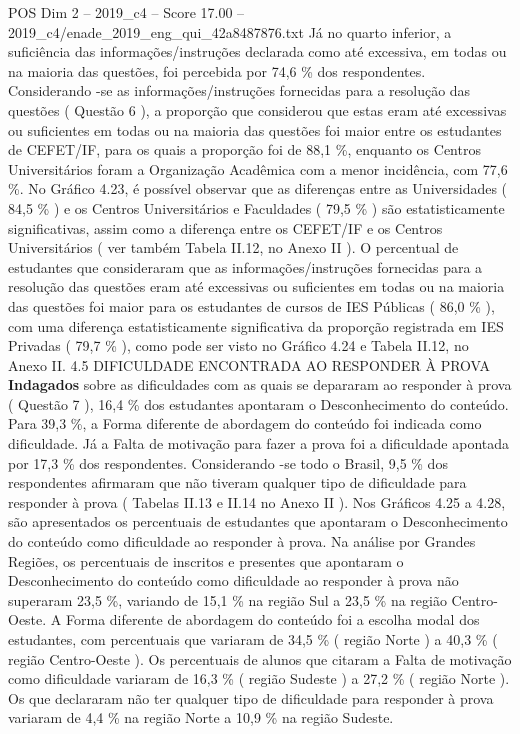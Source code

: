 \begin{textsample}{POS Dim 2 – 2019\_c4 – Score 17.00 – 2019\_c4/enade\_2019\_eng\_qui\_42a8487876.txt}
Já no quarto inferior, a suficiência das informações/instruções declarada como até excessiva, em todas ou na maioria das questões, foi percebida por 74,6 \% dos respondentes.
Considerando -se as informações/instruções fornecidas para a resolução das questões ( Questão 6 ), a proporção que considerou que estas eram até excessivas ou suficientes em todas ou na maioria das questões foi maior entre os estudantes de CEFET/IF, para os quais a proporção foi de 88,1 \%, enquanto os Centros Universitários foram a Organização Acadêmica com a menor incidência, com 77,6 \%.
No Gráfico 4.23, é possível observar que as diferenças entre as Universidades ( 84,5 \% ) e os Centros Universitários e Faculdades ( 79,5 \% ) são estatisticamente significativas, assim como a diferença entre os CEFET/IF e os Centros Universitários ( ver também Tabela II.12, no Anexo II ).
O percentual de estudantes que consideraram que as informações/instruções fornecidas para a resolução das questões eram até excessivas ou suficientes em todas ou na maioria das questões foi maior para os estudantes de cursos de IES Públicas ( 86,0 \% ), com uma diferença estatisticamente significativa da proporção registrada em IES Privadas ( 79,7 \% ), como pode ser visto no Gráfico 4.24 e Tabela II.12, no Anexo II. 4.5 DIFICULDADE ENCONTRADA AO RESPONDER À PROVA \textbf{Indagados} sobre as dificuldades com as quais se depararam ao responder à prova ( Questão 7 ), 16,4 \% dos estudantes apontaram o Desconhecimento do conteúdo.
Para 39,3 \%, a Forma diferente de abordagem do conteúdo foi indicada como dificuldade.
Já a Falta de motivação para fazer a prova foi a dificuldade apontada por 17,3 \% dos respondentes.
Considerando -se todo o Brasil, 9,5 \% dos respondentes afirmaram que não tiveram qualquer tipo de dificuldade para responder à prova ( Tabelas II.13 e II.14 no Anexo II ).
Nos Gráficos 4.25 a 4.28, são apresentados os percentuais de estudantes que apontaram o Desconhecimento do conteúdo como dificuldade ao responder à prova.
Na análise por Grandes Regiões, os percentuais de inscritos e presentes que apontaram o Desconhecimento do conteúdo como dificuldade ao responder à prova não superaram 23,5 \%, variando de 15,1 \% na região Sul a 23,5 \% na região Centro-Oeste.
A Forma diferente de abordagem do conteúdo foi a escolha modal dos estudantes, com percentuais que variaram de 34,5 \% ( região Norte ) a 40,3 \% ( região Centro-Oeste ).
Os percentuais de alunos que citaram a Falta de motivação como dificuldade variaram de 16,3 \% ( região Sudeste ) a 27,2 \% ( região Norte ).
Os que declararam não ter qualquer tipo de dificuldade para responder à prova variaram de 4,4 \% na região Norte a 10,9 \% na região Sudeste.

\end{textsample}
